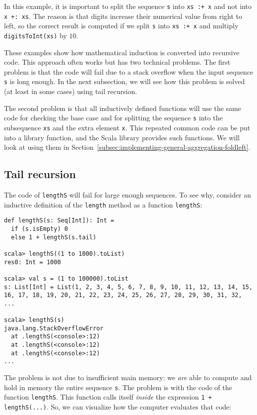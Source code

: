 \noindent In this example, it is important to split the sequence \lstinline!s!
into \lstinline!xs :+ x! and not into \lstinline!x +: xs!. The reason
is that digits increase their numerical value from right to left,
so the correct result is computed if we split \lstinline!s! into
\lstinline!xs :+ x! and multiply \lstinline!digitsToInt(xs)! by
$10$.

These examples show how mathematical induction is converted into recursive
code. This approach often works but has two technical problems. The
first problem is that the code will fail due to a stack overflow when
the input sequence \lstinline!s! is long enough. In the next subsection,
we will see how this problem is solved (at least in some cases) using
tail recursion. 

The second problem is that all inductively defined functions will
use the same code for checking the base case and for splitting the
sequence \lstinline!s! into the subsequence \lstinline!xs! and the
extra element \lstinline!x!. This repeated common code can be put
into a library function, and the Scala library provides such functions.
We will look at using them in Section~\ref{subsec:implementing-general-aggregation-foldleft}.

\subsection{Tail recursion\label{subsec:Tail-recursion}}

The code of \lstinline!lengthS! will fail for large enough sequences.
To see why, consider an inductive definition of the \lstinline!length!
method as a function \lstinline!lengthS!:
\begin{lstlisting}
def lengthS(s: Seq[Int]): Int =
  if (s.isEmpty) 0
  else 1 + lengthS(s.tail)

scala> lengthS((1 to 1000).toList)
res0: Int = 1000

scala> val s = (1 to 100000).toList
s: List[Int] = List(1, 2, 3, 4, 5, 6, 7, 8, 9, 10, 11, 12, 13, 14, 15, 16, 17, 18, 19, 20, 21, 22, 23, 24, 25, 26, 27, 28, 29, 30, 31, 32, ...

scala> lengthS(s)
java.lang.StackOverflowError
  at .lengthS(<console>:12)
  at .lengthS(<console>:12)
  at .lengthS(<console>:12)
...
\end{lstlisting}
The problem is not due to insufficient main memory: we \emph{are}
able to compute and hold in memory the entire sequence \lstinline!s!.
The problem is with the code of the function \lstinline!lengthS!.
This function calls itself \emph{inside} the expression \lstinline!1 + lengthS(...)!.
So, we can visualize how the computer evaluates that code:

